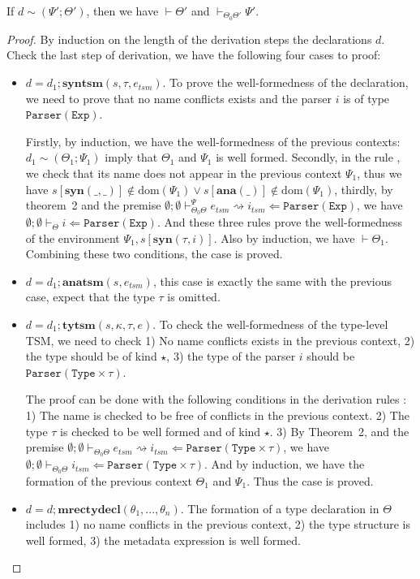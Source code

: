 \documentclass{sig-alternate}[10pt]
\begin{document}
\begin{lemma} If $d\sim(\Psi';\Theta')$, then we have $\vdash\Theta'$ and $\vdash_{\Theta_0\Theta'}\Psi'$.
\end{lemma}
\begin{proof}
By induction on the length of the derivation steps the declarations $d$. Check the last step of derivation, we have the following four cases to proof:
\begin{itemize}
\item $d=d_1;\mathbf{syntsm}(s,\tau,e_{tsm})$. To prove the well-formedness of the declaration, we need to prove that no name conflicts exists and the parser $i$ is of type $\mathtt{Parser}(\mathtt{Exp})$. 

Firstly, by induction, we have the well-formedness of the previous contexts: $d_1\sim(\Theta_1;\Psi_1)$ imply that $\Theta_1$ and $\Psi_1$ is well formed. Secondly, in the rule , we check that its name does not appear in the previous context $\Psi_1$, thus we have $s[\mathbf{syn}(\_,\_)]\notin\text{dom}(\Psi_1)\lor s[\mathbf{ana}(\_)]\notin\text{dom}(\Psi_1)$, thirdly, by theorem~2 and the premise $\emptyset;\emptyset\vdash_{\Theta_0\Theta}^{\Psi}e_{tsm}\rightsquigarrow i_{tsm} \Leftarrow \mathtt{Parser(Exp)}$, we have $\emptyset;\emptyset\vdash_{\Theta}i\Leftarrow\mathtt{Parser}(\mathtt{Exp})$. And these three rules prove the well-formedness of the environment $\Psi_1,s[\mathbf{syn}(\tau,i)]$. Also by induction, we have $\vdash\Theta_1$. Combining these two conditions, the case is proved.
\item $d=d_1;\mathbf{anatsm}(s,e_{tsm})$, this case is exactly the same with the previous case, expect that the type $\tau$ is omitted.
\item $d=d_1;\mathbf{tytsm}(s,\kappa,\tau,e)$. To check the well-formedness of the type-level TSM, we need to check 1) No name conflicts exists in the previous context, 2) the type should be of kind $\star$, 3) the type of the parser $i$ should be $\mathtt{Parser}(\mathtt{Type}\times\tau)$.

The proof can be done with the following conditions in the derivation rules : 1) The name is checked to be free of conflicts in the previous context. 2) The type $\tau$ is checked to be well formed and of kind $\star$. 3) By Theorem~2, and the premise $\emptyset;\emptyset\vdash_{\Theta_0\Theta}e_{tsm}\rightsquigarrow i_{tsm}\Leftarrow \mathtt{Parser}(\mathtt{Type}\times\tau)$, we have  $\emptyset;\emptyset\vdash_{\Theta_0\Theta} i_{tsm}\Leftarrow \mathtt{Parser}(\mathtt{Type}\times\tau)$. And by induction, we have the formation of the previous context $\Theta_1$ and $\Psi_1$. Thus the case is proved.
\item $d=d;\mathbf{mrectydecl}(\theta_1,...,\theta_n)$. The formation of a type declaration in $\Theta$ includes 1) no name conflicts in the previous context, 2) the type structure is well formed, 3) the metadata expression is well formed.


\end{itemize}
\end{proof}
\end{document}
